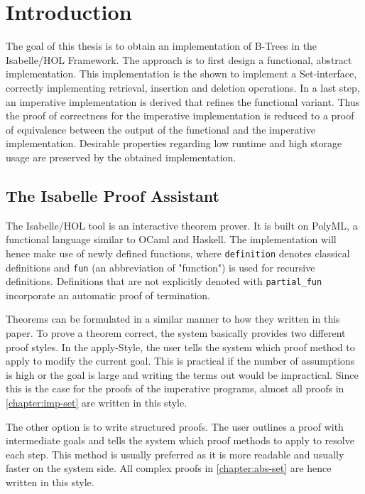 
\chapter{Introduction}\label{chapter:introduction}

The goal of this thesis is to obtain an implementation of B-Trees in the Isabelle/HOL Framework.
The approach is to first design a functional, abstract implementation.
This implementation is the shown to implement a Set-interface,
correctly implementing retrieval, insertion and deletion operations.
In a last step, an imperative implementation is derived that
refines the functional variant.
Thus the proof of correctness for the imperative implementation
is reduced to a proof of equivalence between the output of the
functional and the imperative implementation.
Desirable properties regarding low runtime and high storage usage
are preserved by the obtained implementation.

\section{The Isabelle Proof Assistant}

The Isabelle/HOL tool is an interactive theorem prover.
It is built on PolyML, a functional language similar to OCaml
and Haskell.%
The implementation will hence make use of newly defined functions, where
\texttt{definition} denotes classical definitions and \texttt{fun} (an abbreviation of "function")
is used for recursive definitions.
Definitions that are not explicitly denoted with \texttt{partial\_fun}
incorporate an automatic proof of termination.

Theorems can be formulated in a similar manner to how they written in this paper.
To prove a theorem correct, the system basically provides two different
proof styles.
In the apply-Style, the user tells the system which proof method
to apply to modify the current goal.
This is practical if the number of assumptions
is high or the goal is large and writing the terms
out would be impractical.
Since this is the case for the proofs of the imperative programs,
almost all proofs in \autoref{chapter:imp-set} are written in this style.

The other option is to write structured proofs.
The user outlines a proof with intermediate goals
and tells the system which proof methods to apply to
resolve each step.
This method is usually preferred as it is more readable and usually
faster on the system side.
All complex proofs in \autoref{chapter:abs-set} are hence written in this style.

